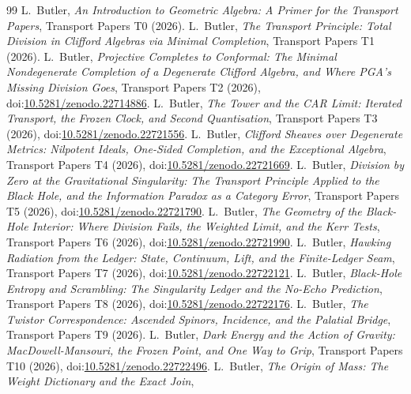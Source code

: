 \documentclass[11pt]{article}
\theoremstyle{definition}
\theoremstyle{plain}
\begin{document}
\begin{thebibliography}{99}
 L.~Butler,
\emph{An Introduction to Geometric Algebra: A Primer for the Transport Papers},
Transport Papers T0 (2026).
 L.~Butler,
\emph{The Transport Principle: Total Division in Clifford Algebras via Minimal Completion},
Transport Papers T1 (2026).
 L.~Butler,
\emph{Projective Completes to Conformal: The Minimal Nondegenerate Completion of a Degenerate Clifford Algebra, and Where PGA's Missing Division Goes},
Transport Papers T2 (2026), doi:\href{https://doi.org/10.5281/zenodo.22714886}{10.5281/zenodo.22714886}.
 L.~Butler,
\emph{The Tower and the CAR Limit: Iterated Transport, the Frozen Clock, and Second Quantisation},
Transport Papers T3 (2026), doi:\href{https://doi.org/10.5281/zenodo.22721556}{10.5281/zenodo.22721556}.
 L.~Butler,
\emph{Clifford Sheaves over Degenerate Metrics: Nilpotent Ideals, One-Sided Completion, and the Exceptional Algebra},
Transport Papers T4 (2026), doi:\href{https://doi.org/10.5281/zenodo.22721669}{10.5281/zenodo.22721669}.
 L.~Butler,
\emph{Division by Zero at the Gravitational Singularity: The Transport Principle Applied to the Black Hole, and the Information Paradox as a Category Error},
Transport Papers T5 (2026), doi:\href{https://doi.org/10.5281/zenodo.22721790}{10.5281/zenodo.22721790}.
 L.~Butler,
\emph{The Geometry of the Black-Hole Interior: Where Division Fails, the Weighted Limit, and the Kerr Tests},
Transport Papers T6 (2026), doi:\href{https://doi.org/10.5281/zenodo.22721990}{10.5281/zenodo.22721990}.
 L.~Butler,
\emph{Hawking Radiation from the Ledger: State, Continuum, Lift, and the Finite-Ledger Seam},
Transport Papers T7 (2026), doi:\href{https://doi.org/10.5281/zenodo.22722121}{10.5281/zenodo.22722121}.
 L.~Butler,
\emph{Black-Hole Entropy and Scrambling: The Singularity Ledger and the No-Echo Prediction},
Transport Papers T8 (2026), doi:\href{https://doi.org/10.5281/zenodo.22722176}{10.5281/zenodo.22722176}.
 L.~Butler,
\emph{The Twistor Correspondence: Ascended Spinors, Incidence, and the Palatial Bridge},
Transport Papers T9 (2026).
 L.~Butler,
\emph{Dark Energy and the Action of Gravity: MacDowell-Mansouri, the Frozen Point, and One Way to Grip},
Transport Papers T10 (2026), doi:\href{https://doi.org/10.5281/zenodo.22722496}{10.5281/zenodo.22722496}.
 L.~Butler,
\emph{The Origin of Mass: The Weight Dictionary and the Exact Join},

\end{thebibliography}
\end{document}

